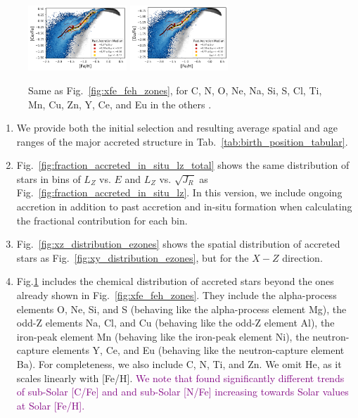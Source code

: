 \documentclass[fleqn,usenatbib]{mnras}
\newcommand{\changed}[1]{{\textcolor{purple}{#1}}}
\begin{document}
\begin{figure}
    \includegraphics[width=0.33\textwidth]{figures/xfe_feh_zones_Ce.png}
    \includegraphics[width=0.33\textwidth]{figures/xfe_feh_zones_Eu.png}
    \caption{Same as Fig.~\ref{fig:xfe_feh_zones}, for C, N, O, Ne, Na, Si, S, Cl, Ti, Mn, Cu, Zn, Y, Ce, and Eu in the others \href{https://github.com/svenbuder/golden_thread_I/tree/main/figures}{\faGithub}.}
    \label{fig:additional_xfe_feh_zones}
\end{figure}

\begin{enumerate}[leftmargin=2em,labelwidth=0em]
    \item We provide both the initial selection and resulting average spatial and age ranges of the major accreted structure in Tab.~\ref{tab:birth_position_tabular}.
    \item Fig.~\ref{fig:fraction_accreted_in_situ_lz_total} shows the same distribution of stars in bins of $L_Z$ vs. $E$ and $L_Z$ vs. $\sqrt{J_R}$ as Fig.~\ref{fig:fraction_accreted_in_situ_lz}. In this version, we include ongoing accretion in addition to past accretion and in-situ formation when calculating the fractional contribution for each bin. 
    \item Fig.~\ref{fig:xz_distribution_ezones} shows the spatial distribution of accreted stars as Fig.~\ref{fig:xy_distribution_ezones}, but for the $X-Z$ direction.
    \item Fig.\ref{fig:additional_xfe_feh_zones} includes the chemical distribution of accreted stars beyond the ones already shown in Fig.~\ref{fig:xfe_feh_zones}. They include the alpha-process elements O, Ne, Si, and S (behaving like the alpha-process element Mg), the odd-Z elements Na, Cl, and Cu (behaving like the odd-Z element Al), the iron-peak element Mn (behaving like the iron-peak element Ni), the neutron-capture elements Y, Ce, and Eu (behaving like the neutron-capture element Ba). For completeness, we also include C, N, Ti, and Zn. We omit He, as it scales linearly with [Fe/H]. \changed{We note that \citet[][see their Fig.~15]{Khoperskov2023c} found significantly different trends of sub-Solar [C/Fe] and and sub-Solar [N/Fe] increasing towards Solar values at Solar [Fe/H].}
\end{enumerate}

\label{lastpage}
\end{document}
